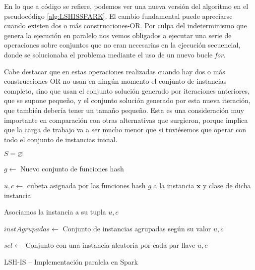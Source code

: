 En lo que a código se refiere, podemos ver una nueva versión del algoritmo en el pseudocódigo \ref{alg:LSHISSPARK}. El cambio fundamental puede apreciarse cuando existen dos o más construcciones-OR. Por culpa del indeterminismo que genera la ejecución en paralelo nos vemos obligados a ejecutar una serie de operaciones sobre conjuntos que no eran necesarias en la ejecución secuencial, donde se solucionaba el problema mediante el uso de un nuevo bucle \textit{for}.

Cabe destacar que en estas operaciones realizadas cuando hay dos o más construcciones OR no usan en ningún momento el conjunto de instancias completo, sino que usan el conjunto solución generado por iteraciones anteriores, que se supone pequeño, y el conjunto solución generado por esta nueva iteración, que también debería tener un tamaño pequeño. Esta es una consideración muy importante en comparación con otras alternativas que surgieron, porque implica que la carga de trabajo va a ser mucho menor que si tuviésemos que operar con todo el conjunto de instancias inicial.


\begin{algorithm*}
\DontPrintSemicolon
{}

$ S = \varnothing $

 {
	$g\leftarrow$ Nuevo conjunto de funciones hash
	
   {
		$u,c\leftarrow$ cubeta asignada por las funciones hash $g$ a la instancia $\mathbf{x}$ y clase de dicha instancia 

		Asociamos la instancia a su tupla $u,c$
	}
	
	$instAgrupadas\leftarrow$ Conjunto de instancias agrupadas según su valor $u,c$
	
	$sel\leftarrow$ Conjunto con una instancia aleatoria por cada par llave $u,c$
	
		
}

\caption{LSH-IS -- Implementación paralela en Spark}
\label{alg:LSHISSPARK}
\end{algorithm*}

